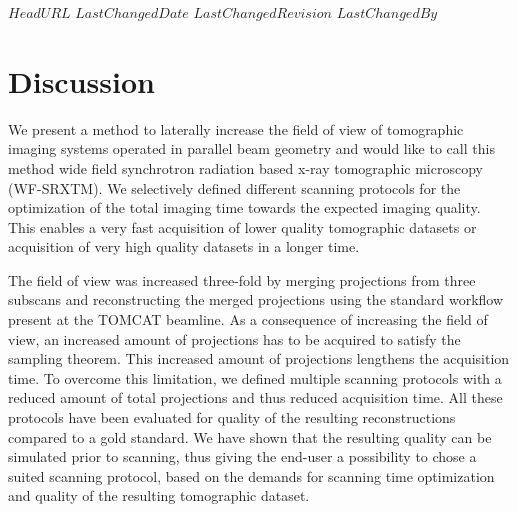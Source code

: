\svnidlong
{$HeadURL$}
{$LastChangedDate$}
{$LastChangedRevision$}
{$LastChangedBy$}
%
%
\section{Discussion}\label{sec:Discussion}%

We present a method to laterally increase the field of view of tomographic imaging systems operated in parallel beam geometry and would like to call this method wide field synchrotron radiation based x-ray tomographic microscopy (WF-SRXTM). We selectively defined different scanning protocols for the optimization of the total imaging time towards the expected imaging quality. This enables a very fast acquisition of lower quality tomographic datasets or acquisition of very high quality datasets in a longer time.

The field of view was increased three-fold by merging projections from three subscans and reconstructing the merged projections using the standard workflow present at the TOMCAT beamline. As a consequence of increasing the field of view, an increased amount of projections has to be acquired to satisfy the sampling theorem. This increased amount of projections lengthens the acquisition time. To overcome this limitation, we defined multiple scanning protocols with a reduced amount of total projections and thus reduced acquisition time. All these protocols have been evaluated for quality of the resulting reconstructions compared to a gold standard. We have shown that the resulting quality can be simulated prior to scanning, thus giving the end-user a possibility to chose a suited scanning protocol, based on the demands for scanning time optimization and quality of the resulting tomographic dataset.

